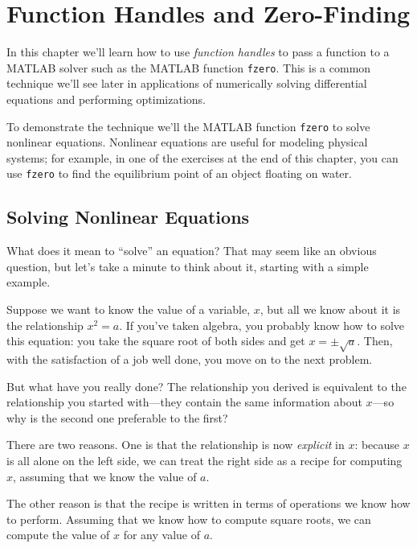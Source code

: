 \chapter{Function Handles and Zero-Finding}
\label{fzero}

In this chapter we'll learn how to use \emph{function handles} to pass a function to a MATLAB solver such as the MATLAB function \lstinline{fzero}.   This is a common technique we'll see later in applications of numerically solving differential equations and performing optimizations.

To demonstrate the technique we'll the MATLAB function \lstinline{fzero} to solve nonlinear equations.
Nonlinear equations are useful for modeling physical systems; for example, in one of
the exercises at the end of this chapter, you can use \lstinline{fzero} to find the equilibrium point of an object floating on water.

\section{Solving Nonlinear Equations}


What does it mean to ``solve'' an equation?  That may seem like an
obvious question, but let's take a minute to think about it,
starting with a simple \mbox{example}.

Suppose we want to know the
value of a variable, $x$, but all we know about it is the relationship
$x^2 = a$. If you've taken algebra, you probably  know how to solve this
equation: you take the square root of both sides and get
$x = \pm \sqrt{a}$.  Then, with the satisfaction of a job well done,
you move on to the next problem.


But what have you really done?  The relationship you derived is
equivalent to the relationship you started with---they contain the
same information about $x$---so why is the second one preferable
to the first?

There are two reasons.  One is that the relationship is now \emph{explicit} in $x$: because $x$ is all alone on the left side, we can treat the right side as a recipe for computing $x$, assuming that we know the value of $a$.


The other reason is that the recipe is written in terms of operations
we know how to perform.  Assuming that we know how to compute square
roots, we can compute the value of $x$ for any value of $a$.

